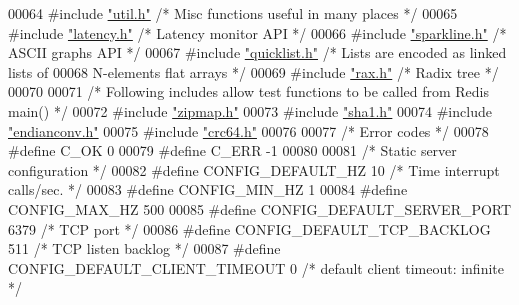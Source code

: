 \begin{DoxyCode}
00064 \textcolor{preprocessor}{#}\textcolor{preprocessor}{include} \hyperlink{util_8h}{"util.h"}            \textcolor{comment}{/* Misc functions useful in many places */}
00065 \textcolor{preprocessor}{#}\textcolor{preprocessor}{include} \hyperlink{latency_8h}{"latency.h"}            \textcolor{comment}{/* Latency monitor API */}
00066 \textcolor{preprocessor}{#}\textcolor{preprocessor}{include} \hyperlink{sparkline_8h}{"sparkline.h"}              \textcolor{comment}{/* ASCII graphs API */}
00067 \textcolor{preprocessor}{#}\textcolor{preprocessor}{include} \hyperlink{quicklist_8h}{"quicklist.h"}               \textcolor{comment}{/* Lists are encoded as linked lists of}
00068 \textcolor{comment}{                           N-elements flat arrays */}
00069 \textcolor{preprocessor}{#}\textcolor{preprocessor}{include} \hyperlink{rax_8h}{"rax.h"}            \textcolor{comment}{/* Radix tree */}
00070 
00071 \textcolor{comment}{/* Following includes allow test functions to be called from Redis main() */}
00072 \textcolor{preprocessor}{#}\textcolor{preprocessor}{include} \hyperlink{zipmap_8h}{"zipmap.h"}
00073 \textcolor{preprocessor}{#}\textcolor{preprocessor}{include} \hyperlink{sha1_8h}{"sha1.h"}
00074 \textcolor{preprocessor}{#}\textcolor{preprocessor}{include} \hyperlink{endianconv_8h}{"endianconv.h"}
00075 \textcolor{preprocessor}{#}\textcolor{preprocessor}{include} \hyperlink{crc64_8h}{"crc64.h"}
00076 
00077 \textcolor{comment}{/* Error codes */}
00078 \textcolor{preprocessor}{#}\textcolor{preprocessor}{define} \textcolor{preprocessor}{C\_OK}                    0
00079 \textcolor{preprocessor}{#}\textcolor{preprocessor}{define} \textcolor{preprocessor}{C\_ERR}                   \textcolor{preprocessor}{-}1
00080 
00081 \textcolor{comment}{/* Static server configuration */}
00082 \textcolor{preprocessor}{#}\textcolor{preprocessor}{define} \textcolor{preprocessor}{CONFIG\_DEFAULT\_HZ}        10      \textcolor{comment}{/* Time interrupt calls/sec. */}
00083 \textcolor{preprocessor}{#}\textcolor{preprocessor}{define} \textcolor{preprocessor}{CONFIG\_MIN\_HZ}            1
00084 \textcolor{preprocessor}{#}\textcolor{preprocessor}{define} \textcolor{preprocessor}{CONFIG\_MAX\_HZ}            500
00085 \textcolor{preprocessor}{#}\textcolor{preprocessor}{define} \textcolor{preprocessor}{CONFIG\_DEFAULT\_SERVER\_PORT}        6379    \textcolor{comment}{/* TCP port */}
00086 \textcolor{preprocessor}{#}\textcolor{preprocessor}{define} \textcolor{preprocessor}{CONFIG\_DEFAULT\_TCP\_BACKLOG}       511     \textcolor{comment}{/* TCP listen backlog */}
00087 \textcolor{preprocessor}{#}\textcolor{preprocessor}{define} \textcolor{preprocessor}{CONFIG\_DEFAULT\_CLIENT\_TIMEOUT}       0       \textcolor{comment}{/* default client timeout: infinite */}

\end{DoxyCode}
